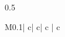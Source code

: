 \begin{table}
\begin{subtable}[t!]{0.5\textwidth}
\begin{tabular}{M{0.1\textwidth}| c| c| c | c }

\end{tabular}
\end{subtable}
\end{table}
